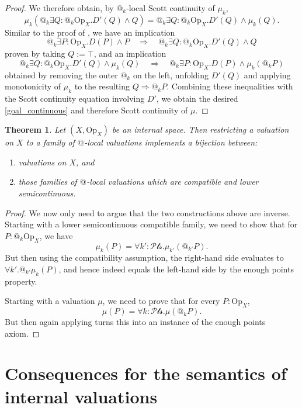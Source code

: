 \documentclass[11pt, oneside, article]{memoir}
\makeatletter
\theoremstyle{plain}
\newtheorem{theorem}{Theorem}[chapter] %
\theoremstyle{definition}
\theoremstyle{remark}
\newcommand{\Set}[1]{\mathrm{#1}}
\newcommand{\Op}{\Set{Op}}
\newcommand{\pt}{k}				%
\newcommand{\Pts}{\mathcal{Pts}}		%
\newcommand{\AtSymbol}{{@}}
\newcommand{\At}[1][\pt]{\AtSymbol_{#1}}
\newcommand{\imp}{\Rightarrow}
\makeatother
\begin{document}
\begin{proof}
	We therefore obtain, by $\At$-local Scott continuity of $\mu_\pt$,
	\[
		\mu_\pt\left( \At \exists Q : \At \Op_X . D'(Q) \land Q \right) = \At \exists Q : \At \Op_X . D'(Q) \land \mu_\pt(Q).
	\]
	Similar to the proof of , we have an implication
	\[
		\At \exists P : \Op_X . D(P) \land P \quad \Longrightarrow \quad \At \exists Q : \At \Op_X . D'(Q) \land Q
	\]
	proven by taking $Q := \top$, and an implication
	\[
		\At \exists Q : \At \Op_X . D'(Q) \land \mu_\pt(Q) \quad \Longrightarrow \quad \At \exists P : \Op_X . D(P) \land \mu_\pt(\At P)
	\]
	obtained by removing the outer $\At$ on the left, unfolding $D'(Q)$ and applying monotonicity of $\mu_\pt$ to the resulting $Q \imp \At P$. Combining these inequalities with the Scott continuity equation involving $D'$, we obtain the desired \eqref{goal_continuous} and therefore Scott continuity of $\mu$.
\end{proof}

\begin{theorem}
	\label{main_internal}
	Let $(X,\Op_X)$ be an internal space. Then restricting a valuation on $X$ to a family of $\At[]$-local valuations implements a bijection between:
	\begin{enumerate}
		\item valuations on $X$, and
		\item those families of $\At[]$-local valuations which are compatible and lower semicontinuous.
	\end{enumerate}
\end{theorem}

\begin{proof}
	We now only need to argue that the two constructions above are inverse. Starting with a lower semicontinuous compatible family, we need to show that for $P : \At \Op_X$, we have
	\[
		\mu_\pt(P) = \forall \pt' : \Pts . \mu_{\pt'}( \At[\pt'] P).
	\]
	But then using the compatibility assumption, the right-hand side evaluates to $\forall \pt' . \At[\pt'] \mu_\pt(P)$, and hence indeed equals the left-hand side by the enough points property.

	Starting with a valuation $\mu$, we need to prove that for every $P : \Op_X$,
	\[
		\mu(P) = \forall \pt : \Pts . \mu(\At P).
	\]
	But then again applying  turns this into an instance of the enough points axiom.
\end{proof}

\chapter{Consequences for the semantics of internal valuations}
\end{document}
